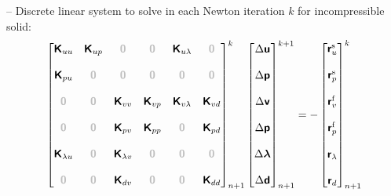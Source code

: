 \documentclass[a4paper,12pt]{report}
\newcommand{\bs}[1]{\boldsymbol{#1}}
\newcommand{\zerom}{\textcolor{lightgray}{\bs{\mathsf{0}}}}
\newcommand{\ROP}{\bs{\mathsf{r}}}
\newcommand{\LM}{\bs{\mathsf{\lambda}}}
\newcommand{\lmi}{\lambda} %
\begin{document}
-- Discrete linear system to solve in each Newton iteration $k$ for incompressible solid:
\begin{align}
\begin{bmatrix} \bs{\mathsf{K}}_{uu} & \bs{\mathsf{K}}_{up} & \zerom & \zerom & \bs{\mathsf{K}}_{u\lmi} & \zerom \\ \\ \bs{\mathsf{K}}_{pu} & \zerom & \zerom & \zerom & \zerom & \zerom \\ \\ \zerom & \zerom & \bs{\mathsf{K}}_{vv} & \bs{\mathsf{K}}_{vp} & \bs{\mathsf{K}}_{v\lmi} & \bs{\mathsf{K}}_{vd} \\ \\ \zerom & \zerom & \bs{\mathsf{K}}_{pv} & \bs{\mathsf{K}}_{pp} & \zerom & \bs{\mathsf{K}}_{pd} \\ \\ \bs{\mathsf{K}}_{\lmi u} & \zerom & \bs{\mathsf{K}}_{\lmi v} & \zerom & \zerom & \zerom \\ \\ \zerom &  \zerom & \bs{\mathsf{K}}_{dv}  & \zerom & \zerom & \bs{\mathsf{K}}_{dd} \end{bmatrix}_{n+1}^{k}\begin{bmatrix} \Delta\bs{\mathsf{u}} \\ \\ \Delta\bs{\mathsf{p}} \\ \\ \Delta\bs{\mathsf{v}} \\ \\ \Delta\bs{\mathsf{p}} \\ \\ \Delta\LM \\ \\ \Delta\bs{\mathsf{d}} \end{bmatrix}_{n+1}^{k+1}=-\begin{bmatrix} \ROP_{u}^{\mathrm{s}} \\ \\ \ROP_{p}^{\mathrm{s}} \\ \\ \ROP_{v}^{\mathrm{f}} \\ \\ \ROP_{p}^{\mathrm{f}} \\ \\ \ROP_{\lmi} \\ \\ \ROP_{d}\end{bmatrix}_{n+1}^{k} \label{eq:lin_sys_fsi_inc}
\end{align}
\end{document}
